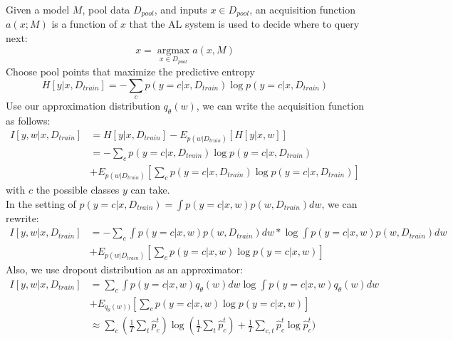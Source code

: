 \documentclass{article}
\begin{document}
\noindent Given a model $M$, pool data $D_{pool}$, and inputs $x \in D_{pool}$, an acquisition function $a(x;M)$ is a function of $x$ that the
AL system is used to decide where to query next:
\[x=\operatorname*{argmax}_{x\in D_{pool}} a(x,M)\]
Choose pool points that maximize the predictive entropy
\[H[y|x,D_{train}]=-\sum_c p(y=c|x,D_{train}) \log p(y=c|x,D_{train})\]
Use our approximation distribution $q_\theta(w)$, we can write the acquisition function as follows:
\begin{align*}
I[y,w|x,D_{train}] &=H[y|x,D_{train}]-E_{p(w|D_{train})}[H[y|x,w]]\\
& =-\sum_c p(y=c|x,D_{train})\log p(y=c|x,D_{train})\\
& + E_{p(w|D_{train})}[\sum_c p(y=c|x,D_{train})\log p(y=c|x,D_{train})]
\end{align*}
\noindent with $c$ the possible classes $y$ can take.\\
\noindent In the setting of $p(y=c|x,D_{train})=\int p(y=c|x,w)p(w,D_{train})dw$, we can rewrite:
\begin{align*}
I[y,w|x,D_{train}] &= -\sum_c \int p(y=c|x,w)p(w,D_{train})dw * \log \int p(y=c|x,w)p(w,D_{train})dw\\
& + E_{p(w|D_{train})}[\sum_c p(y=c|x,w)\log p(y=c|x,w)]
\end{align*}
\noindent Also, we use dropout distribution as an approximator:
\begin{align*}
I[y,w|x,D_{train}] &=\sum_c \int p(y=c|x,w)q_\theta(w)dw \log \int p(y=c|x,w)q_\theta(w)dw\\ 
& + E_{q_\theta(w))}[\sum_c p(y=c|x,w)\log p(y=c|x,w)]\\
& \approx \sum_c (\frac{1}{T}\sum_t\hat{p}_c^t)\log (\frac{1}{T}\sum_t\hat{p}_c^t)+\frac{1}{T}\sum_{c,t}\hat{p}_c^t\log\hat{p}_c^t)\
\end{align*}
\end{document}
